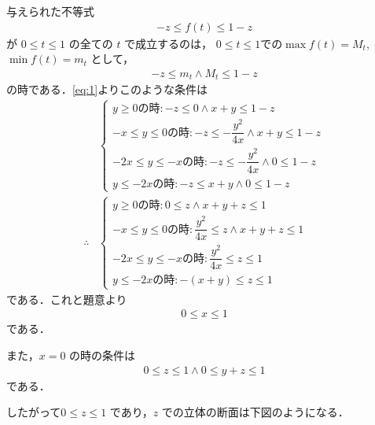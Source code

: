 \documentclass[../../main.tex]{subfiles}
\begin{document}
与えられた不等式
\begin{align}
  -z \le f(t) \le 1-z
\end{align}
が $0 \le t \le 1$ の全ての $t$ で成立するのは，
$0 \le t \le 1$での$\max f(t) = M_t$, $\min f(t) = m_t$ として，
\begin{align}
  -z \le m_t \land M_t \le 1-z \label{eq:4}
\end{align}
の時である．\cref{eq:1}よりこのような条件は
\begin{align}
  &
  \begin{cases}
    y \ge 0 \text{の時}: -z \le 0 \land x+y \le 1-z \\
    -x \le y \le 0 \text{の時}: -z \le -\dfrac{y^2}{4x} \land x+y \le 1-z \\
    -2x \le y \le -x \text{の時}: -z \le -\dfrac{y^2}{4x} \land 0 \le 1-z \\
    y \le -2x \text{の時}: -z \le x+y \land 0 \le 1-z
  \end{cases} \\
  \therefore
  &
  \begin{cases}
    y \ge 0 \text{の時}: 0 \le z \land x+y+z \le 1 \\
    -x \le y \le 0 \text{の時}: \dfrac{y^2}{4x} \le z \land x+y+z \le 1 \\
    -2x \le y \le -x \text{の時}: \dfrac{y^2}{4x} \le  z \le 1 \\
    y \le -2x \text{の時}: -(x+y) \le z \le 1
  \end{cases} \label{eq:5}
\end{align}
である．これと題意より
\begin{align}
  0 \le x \le 1 \label{eq:6}
\end{align}
である．

また，$x=0$ の時の条件は
\begin{align}
  0 \le z \le 1 \land 0 \le y+z \le 1 \label{eq:7}
\end{align}
である．

したがって$0 \le z \le 1$ であり，$z$ での立体の断面は下図のようになる．
\end{document}
